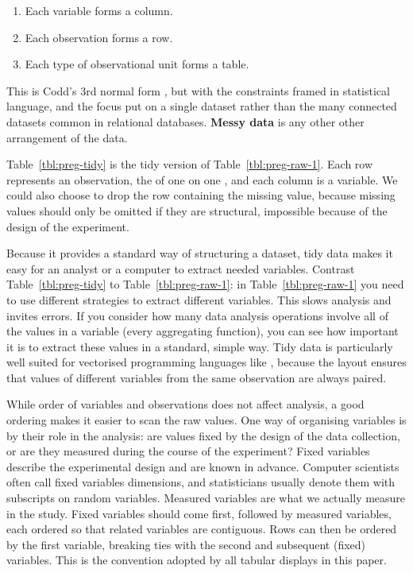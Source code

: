 \documentclass[article]{jss}
\begin{document}
\begin{enumerate}
  \item Each variable forms a column.
  \item Each observation forms a row.
  \item Each type of observational unit forms a table.
\end{enumerate}

\noindent This is Codd's 3rd normal form \citep{codd:1990}, but with the constraints framed in statistical language, and the focus put on a single dataset rather than the many connected datasets common in relational databases. \textbf{Messy data} is any other other arrangement of the data. 

Table~\ref{tbl:preg-tidy} is the tidy version of Table~\ref{tbl:preg-raw-1}. Each row represents an observation, the  of one  on one , and each column is a variable. We could also choose to drop the row containing the missing value, because missing values should only be omitted if they are structural, impossible because of the design of the experiment.

Because it provides a standard way of structuring a dataset, tidy data makes it easy for an analyst or a computer to extract needed variables. Contrast Table~\ref{tbl:preg-tidy} to Table~\ref{tbl:preg-raw-1}: in Table~\ref{tbl:preg-raw-1} you need to use different strategies to extract different variables. This slows analysis and invites errors. If you consider how many data analysis operations involve all of the values in a variable (every aggregating function), you can see how important it is to extract these values in a standard, simple way. Tidy data is particularly well suited for vectorised programming languages like , because the layout ensures that values of different variables from the same observation are always paired.

While order of variables and observations does not affect analysis, a good ordering makes it easier to scan the raw values. One way of organising variables is by their role in the analysis: are values fixed by the design of the data collection, or are they measured during the course of the experiment? Fixed variables describe the experimental design and are known in advance. Computer scientists often call fixed variables dimensions, and statisticians usually denote them with subscripts on random variables. Measured variables are what we actually measure in the study. Fixed variables should come first, followed by measured variables, each ordered so that related variables are contiguous. Rows can then be ordered by the first variable, breaking ties with the second and subsequent (fixed) variables. This is the convention adopted by all tabular displays in this paper. 
\end{document}
